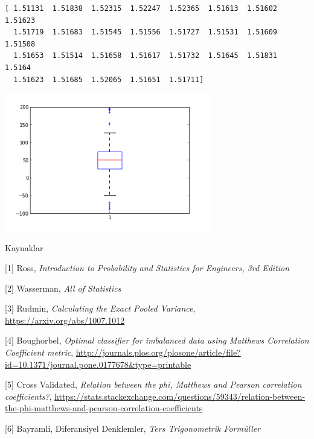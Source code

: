 \documentclass[12pt,fleqn]{article}\usepackage{../../common}
\begin{document}
\begin{verbatim}
[ 1.51131  1.51838  1.52315  1.52247  1.52365  1.51613  1.51602  1.51623
  1.51719  1.51683  1.51545  1.51556  1.51727  1.51531  1.51609  1.51508
  1.51653  1.51514  1.51658  1.51617  1.51732  1.51645  1.51831  1.5164
  1.51623  1.51685  1.52065  1.51651  1.51711]
\end{verbatim}

\includegraphics[height=6cm]{stat_feat_02.png}

Kaynaklar

[1] Ross, {\em Introduction to Probability and Statistics for Engineers, 3rd Edition}

[2] Wasserman, {\em All of Statistics}

[3] Rudmin, {\em Calculating the Exact Pooled Variance},
    \url{https://arxiv.org/abs/1007.1012}

[4] Boughorbel, {\em Optimal classifier for imbalanced data using Matthews Correlation Coefficient metric}, \url{http://journals.plos.org/plosone/article/file?id=10.1371/journal.pone.0177678&type=printable}

[5] Cross Validated, {\em Relation between the phi, Matthews and Pearson correlation coefficients?}, \url{https://stats.stackexchange.com/questions/59343/relation-between-the-phi-matthews-and-pearson-correlation-coefficients}

[6] Bayramli, Diferansiyel Denklemler, {\em Ters Trigonometrik Formüller}
\end{document}
